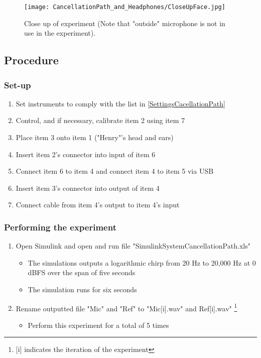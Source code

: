 \begin{figure}[H]
	\centering
	\texttt{[image: CancellationPath\_and\_Headphones/CloseUpFace.jpg]}
	\caption{Close up of experiment (Note that "outside" microphone is not in use in the experiment).}
	\label{CloseUpCancellationPath}
\end{figure}

\subsection{Procedure}
\subsubsection{Set-up}
\begin{enumerate}
	\item Set instruments to comply with the list in \ref{SettingsCacellationPath}
	\item Control, and if necessary, calibrate item 2 using item 7
	\item Place item 3 onto item 1 ("Henry"'s head and ears)
	\item Insert item 2's connector into input of item 6
	\item Connect item 6 to item 4 and connect item 4 to item 5 via USB
	\item Insert item 3's connector into output of item 4
	\item Connect cable from item 4's output to item 4's input
\end{enumerate}

\subsubsection{Performing the experiment}
\begin{enumerate}
	\item Open Simulink\textsuperscript{\textregistered} and open and run file "SimulinkSystemCancellationPath.xls"
	\begin{itemize} 
		\item The simulations outputs a logarithmic chirp from 20 Hz to 20,000 Hz at 0 dBFS over the span of five seconds
		\item The simulation runs for six seconds
	\end{itemize}
	\item Rename outputted file "Mic" and "Ref" to "Mic[i].wav" and Ref[i].wav" \footnote{[i] indicates the iteration of the experiment}
	\begin{itemize}
		\item[] Perform this experiment for a total of 5 times
	\end{itemize}
\end{enumerate}


